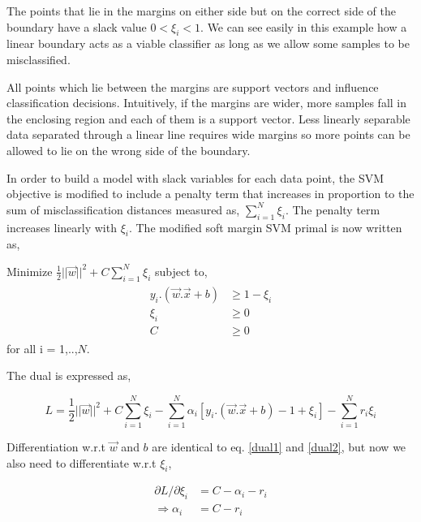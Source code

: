 \documentclass[final,3p,times,twocolumn]{elsarticle}
\begin{document}
The points that lie in the margins on either side but on the correct side of the boundary have a slack value $0 < \xi_{i} < 1$. We can see easily in this example how a linear boundary acts as a viable classifier as long as we allow some samples to be misclassified. 

All points which lie between the margins are support vectors and influence classification decisions. Intuitively, if the margins are wider, more samples fall in the enclosing region and each of them is a support vector. Less linearly separable data separated through a linear line requires wide margins so more points can be allowed to lie on the wrong side of the boundary. 

In order to build a model with slack variables for each data point, the SVM objective is modified to include a penalty term that increases in proportion to the sum of misclassification distances measured as, $\sum_{i=1}^N \xi_{i}$. The penalty term  increases linearly with $\xi_{i}$. The modified soft margin SVM primal is now written as, 

Minimize $\frac{\displaystyle 1}{\displaystyle 2}||\vec{w}||^{2} + C\sum_{i=1}^N \xi_{i}$  subject to,
\begin{align*}
\begin{split}
y_{i}.(\vec{w}.\vec{x} + b) &\geqslant 1 - \xi_{i} \\
\xi_{i} &\geqslant 0 \\
C &\geqslant 0 
\end{split}
\end{align*}
for all  i = 1,..,$N$.

The dual is expressed as, 

\begin{equation}
\label{lagrange_soft}
L = \frac{1}{2}||\vec{w}||^2 + C\sum_{i=1}^N \xi_{i} - \sum_{i=1}^N\alpha_{i}[y_{i}.(\vec{w}.\vec{x} + b) - 1 + \xi_{i}] - \sum_{i=1}^{N}r_{i}\xi_{i} 
\end{equation} 

Differentiation w.r.t $\vec{w}$ and $b$ are identical to eq. \ref{dual1} and \ref{dual2}, but now we also need to differentiate w.r.t \hspace{2mm} $\xi_{i}$, 

\begin{align}
\partial L/ \partial \xi_{i} & = C - \alpha_{i} - r_{i} \nonumber \\ 
\Rightarrow \alpha_{i} & = C - r_{i} 
\label{slack}
\end{align}
\end{document}
